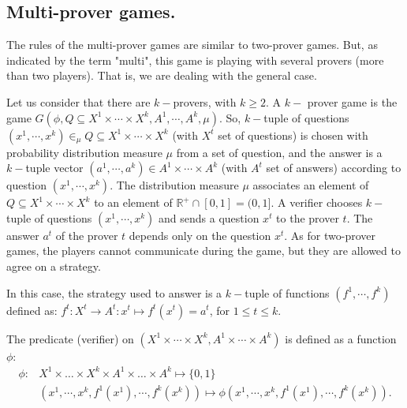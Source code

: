 





 \subsection{Multi-prover games.} The rules of the multi-prover games are similar to two-prover games. But, as indicated by the term "multi", this game is playing
 with several provers (more than two players). That is, we are dealing with the general case.

Let us consider that there are $k-$provers, with $k \geq 2$. A $k-$ prover  game is the game $G(\phi, Q \subseteq X^1  \times \cdots \times X^k , A^1 , \cdots,  A^k, \mu) $. So, $k-$tuple of questions $(x^1, \cdots , x^k) \in_{\mu} Q \subseteq X^1  \times \cdots \times X^k $ (with $X^t$ set of questions)
is chosen with probability distribution measure $\mu $ from a set of question,
and the answer is a $k-$tuple vector $(a^1, \cdots , a^k)  \in A^1 \times \cdots \times A^k$ (with $A^t$ set of answers) according to question $(x^1, \cdots , x^k).$ The distribution measure $\mu $ associates an element of $ Q \subseteq  X^1  \times \cdots \times X^k $ to an element of $\mathbb{R}^+ \cap [0,1]= (0, 1].$
A verifier chooses $k-$tuple of questions $(x^1, \cdots , x^k)$ and sends a question $x^t$ to the prover $t$. The answer $a^t$ of the prover $t$ depends only on the question $x^t.$ As for two-prover games, the players cannot communicate during the game, but they are allowed to agree on a strategy. 

In this case, the strategy used to answer is a $k-$tuple of functions $(f^1, \cdots , f^k)$ defined as:
$f^t: X^t \longrightarrow A^t: x^t \longmapsto f^t(x^t)=a^t$, for $1\leq t \leq k.$

The predicate (verifier) on $( X^1 \times \cdots \times X^k, A^1 \times \cdots \times A^k)$ is defined as a function $\phi$:
\begin{align*}
\phi : & X^1 \times \ldots \times X^k \times A^1 \times \ldots \times A^k \longmapsto \{0,1\} \\
& (x^1, \cdots , x^k, f^1(x^1), \cdots , f^k(x^k)) \longmapsto \phi (x^1, \cdots , x^k, f^1(x^1), \cdots , f^k(x^k)).
\end{align*}

